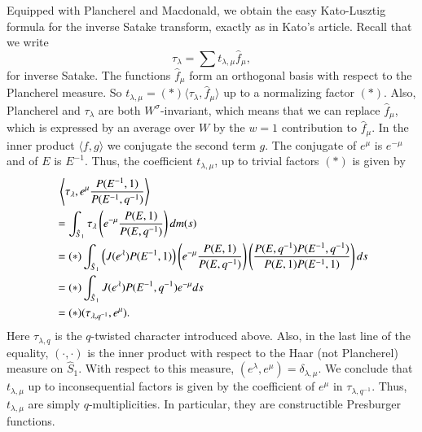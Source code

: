 Equipped with Plancherel and Macdonald, we obtain the easy Kato-Lusztig formula for the inverse Satake transform, exactly as in Kato's article.   Recall that we write
\[
\tau_\lambda = \sum t_{\lambda,\mu} \hat f_\mu,
\]
for inverse Satake.  The functions $\hat f_\mu$ form an orthogonal basis with respect to the Plancherel measure.
So $t_{\lambda,\mu} = (*) \langle\tau_\lambda,\hat f_\mu\rangle$ up to a normalizing factor $(*)$.
Also, Plancherel and $\tau_\lambda$ are both $W^\sigma$-invariant, which means that we can replace $\hat f_\mu$, which is
expressed by an average over $W$ by the $w=1$ contribution to $\hat f_\mu$.
In the inner product $\langle f,g\rangle$ we conjugate the second term $g$.
The conjugate of $e^\mu$ is $e^{-\mu}$ and of $E$ is $E^{-1}$.
Thus, the coefficient $t_{\lambda,\mu}$, up to trivial factors $(*)$ is given by
\begin{align*}
&~\left\langle \tau_\lambda, e^{\mu} \frac{P(E^{-1},1)}{P(E^{-1},q^{-1})}\right\rangle \hfill\\
&=\int_{\hat S_1} \tau_\lambda \left(e^{-\mu} \frac{P(E,1)}{P(E,q^{-1})}\right) dm(s)\hfill \\
&=
(*)\int_{\hat S_1} \left(J(e^\lambda) P(E^{-1},1)\right)  
\left(e^{-\mu} \frac{P(E,1)}{P(E,q^{-1})}\right)
\left(\frac{P(E,q^{-1}) P(E^{-1},q^{-1})}{P(E,1) P(E^{-1},1)}\right) ds\\
&=
(*)\int_{\hat S_1} J(e^\lambda) P(E^{-1},q^{-1}) e^{-\mu} ds\\
&=(*)(\tau_{\lambda,q^{-1}},e^\mu).
\end{align*}
Here $\tau_{\lambda,q}$ is the $q$-twisted character introduced above.
  Also, in the last line of the equality, $(\cdot,\cdot)$ is the inner product with respect to the Haar (not Plancherel) measure on $\hat S_1$.
With respect to this measure, $(e^\lambda,e^\mu) = \delta_{\lambda,\mu}$.  
We conclude that $t_{\lambda,\mu}$ up to inconsequential factors is given by the coefficient of $e^\mu$ in $\tau_{\lambda,{q^{-1}}}$.
Thus, $t_{\lambda,\mu}$ are simply $q$-multiplicities.  In particular, they are constructible Presburger functions.





\newpage
